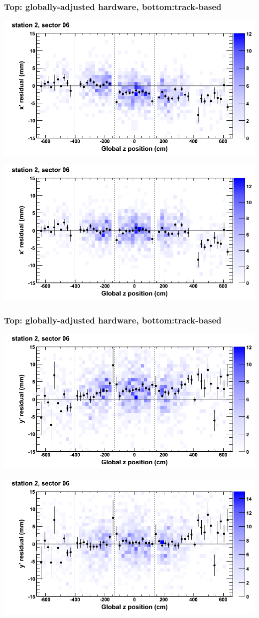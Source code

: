 \documentclass[compress]{beamer}
\begin{document}
\begin{frame}
\frametitle{Top: globally-adjusted hardware, bottom:track-based}
\includegraphics[width=0.7\linewidth]{NOV4_mapplots_HW/DTvsz_st2sec06_x.png}

\includegraphics[width=0.7\linewidth]{NOV4_mapplots/DTvsz_st2sec06_x.png}
\end{frame}

\begin{frame}
\frametitle{Top: globally-adjusted hardware, bottom:track-based}
\includegraphics[width=0.7\linewidth]{NOV4_mapplots_HW/DTvsz_st2sec06_y.png}

\includegraphics[width=0.7\linewidth]{NOV4_mapplots/DTvsz_st2sec06_y.png}
\end{frame}
\end{document}
